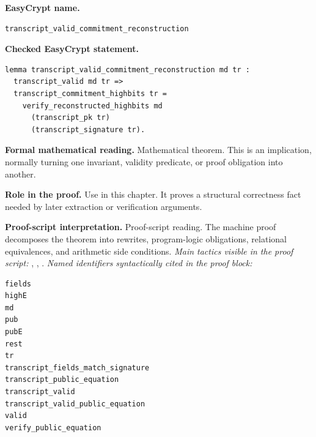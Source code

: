 \begin{formaltheorem}
\noindent\textbf{EasyCrypt name.}
\begin{lstlisting}[language=EasyCrypt,basicstyle=\ttfamily\scriptsize]
transcript_valid_commitment_reconstruction
\end{lstlisting}
\noindent\textbf{Checked EasyCrypt statement.}
\begin{lstlisting}[language=EasyCrypt,basicstyle=\ttfamily\scriptsize]
lemma transcript_valid_commitment_reconstruction md tr :
  transcript_valid md tr =>
  transcript_commitment_highbits tr =
    verify_reconstructed_highbits md
      (transcript_pk tr)
      (transcript_signature tr).
\end{lstlisting}
\noindent\textbf{Formal mathematical reading.}
Mathematical theorem. This is an implication, normally turning one invariant, validity predicate, or proof obligation into another.

\noindent\textbf{Role in the proof.}
Use in this chapter. It proves a structural correctness fact needed by later extraction or verification arguments.

\noindent\textbf{Proof-script interpretation.}
Proof-script reading. The machine proof decomposes the theorem into rewrites, program-logic obligations, relational equivalences, and arithmetic side conditions.
\emph{Main tactics visible in the proof script:} , , .
\emph{Named identifiers syntactically cited in the proof block:}
\begin{lstlisting}[language=EasyCrypt,basicstyle=\ttfamily\scriptsize]
fields
highE
md
pub
pubE
rest
tr
transcript_fields_match_signature
transcript_public_equation
transcript_valid
transcript_valid_public_equation
valid
verify_public_equation
\end{lstlisting}

\end{formaltheorem}

